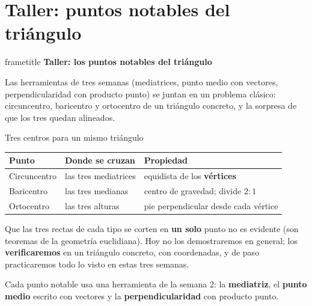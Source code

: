 \documentclass[aspectratio=169,10pt]{beamer}
\newcommand{\destaca}[1]{%
  \par\vspace{3pt}\noindent
  \colorbox{turquesaClaro}{%
    \parbox{\dimexpr\linewidth-2\fboxsep\relax}{\vspace{3pt}#1\vspace{3pt}}}%
  \par\vspace{3pt}}
\newcommand{\hojaSesion}[2]{%
  \vfill
  \begin{beamercolorbox}[wd=\textwidth,sep=16pt,center]{frametitle}
    {\Large\bfseries #1}\\[11pt]
    \begin{minipage}{0.82\textwidth}\centering\small #2\end{minipage}
  \end{beamercolorbox}
  \vfill}
\begin{document}
\section{Taller: puntos notables del triángulo}
\begin{frame}[plain]
  \hojaSesion{Taller: los puntos notables del triángulo}{%
  Las herramientas de tres semanas (mediatrices, punto medio con
  vectores, perpendicularidad con producto punto) se juntan en un
  problema clásico: circuncentro, baricentro y ortocentro de un
  triángulo concreto, y la sorpresa de que los tres quedan alineados.}
\end{frame}
\begin{frame}{Tres centros para un mismo triángulo}
  \centering
  {\small
  \begin{tabular}{@{}lll@{}}
    \toprule
    \textbf{Punto} & \textbf{Donde se cruzan} & \textbf{Propiedad} \\
    \midrule
    Circuncentro & las tres mediatrices & equidista de los \textbf{vértices} \\
    Baricentro & las tres medianas & centro de gravedad; divide $2{:}1$ \\
    Ortocentro & las tres alturas & pie perpendicular desde cada vértice \\
    \bottomrule
  \end{tabular}}
  \par\vspace{0.4cm}
  \raggedright
  Que las tres rectas de cada tipo se corten en \textbf{un solo} punto
  no es evidente (son teoremas de la geometría euclidiana). Hoy no los
  demostraremos en general; los \textbf{verificaremos} en un triángulo
  concreto, con coordenadas, y de paso practicaremos todo lo visto en
  estas tres semanas.

  \vspace{0.2cm}
  \destaca{Cada punto notable usa una herramienta de la semana 2: la
  \textbf{mediatriz}, el \textbf{punto medio} escrito con vectores y
  la \textbf{perpendicularidad} con producto punto.}
\end{frame}
\end{document}

